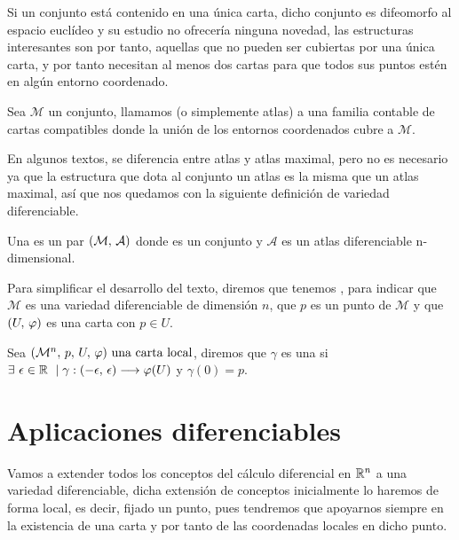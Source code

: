 Si un conjunto está contenido en una única carta, dicho conjunto es difeomorfo al espacio euclídeo y su estudio no
ofrecería ninguna novedad, las estructuras interesantes son por tanto, aquellas que no pueden ser cubiertas por una
única carta, y por tanto necesitan al menos dos cartas para que todos sus puntos estén en algún entorno coordenado.

\begin{definition}
Sea $\mathcal{M}$ un conjunto, llamamos  (o simplemente atlas) a una
familia contable de cartas compatibles donde la unión de los entornos coordenados cubre a $\mathcal{M}$.
\end{definition}

En algunos textos, se diferencia entre atlas y atlas maximal, pero no es necesario ya que la estructura que dota al
conjunto un atlas es la misma que un atlas maximal, así que nos quedamos con la siguiente definición de variedad
diferenciable.

\begin{definition}
  Una  es un par $(\mathcal{M},\thinspace\mathcal{A})$
  donde  es un conjunto y $\mathcal{A}$ es un atlas diferenciable n-dimensional.
\end{definition}
Para simplificar el desarrollo del texto, diremos que tenemos ,
para indicar que $\mathcal{M}$ es una variedad diferenciable de dimensión $n$, que $p$ es un punto de
$\mathcal{M}$ y que $(U,\thinspace\varphi)$ es una carta con $p\in
U$.

\begin{definition}
  Sea $(\mathcal{M}^n,\thinspace p,\thinspace U,\thinspace \varphi)\textmd{ una carta local}$, diremos que $\gamma$ es una \label{curva-centrada} si $\exists\ \epsilon\in\mathbb{R} \ \mid \gamma:(-\epsilon,\thinspace\epsilon)
  \longrightarrow \varphi(U)$ y
  $\gamma(0)=p$.
\end{definition}

\section{Aplicaciones diferenciables}
Vamos a extender todos los conceptos del cálculo diferencial en $\mathbb{R}^n$ a una variedad diferenciable, dicha extensión
de conceptos inicialmente lo haremos de forma local, es decir, fijado un punto, pues tendremos que apoyarnos siempre
en la existencia de una carta y por tanto de las coordenadas locales en dicho punto.


